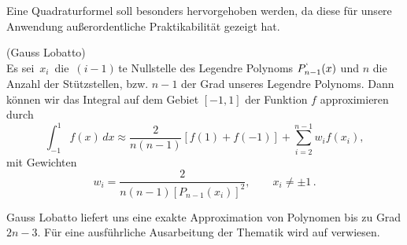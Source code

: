 Eine Quadraturformel soll besonders hervorgehoben werden, da diese für unsere Anwendung außerordentliche Praktikabilität gezeigt hat. 

\begin{Definition} (Gauss Lobatto) \\
Es sei $\, x_i \, $ die $\, (i-1) \,$te Nullstelle des Legendre Polynoms $P^{`}_{n-1}(x)$ und $n$ die Anzahl der Stützstellen, bzw. $n-1$ der Grad unseres Legendre Polynoms. Dann können wir das Integral auf dem Gebiet $[-1,1]$ der Funktion $f$ approximieren durch
\begin{equation*}
\int _{-1}^{1}{f(x)\,dx} \approx {\frac {2}{n(n-1)}}[f(1)+f(-1)]+\sum _{i=2}^{n-1}{w_{i}f(x_{i})},
\end{equation*}
mit Gewichten
\begin{equation*}
w_{i}={\frac {2}{n(n-1)[P_{n-1}(x_{i})]^{2}}},\qquad x_{i}\neq \pm 1 \, .
\end{equation*}
\end{Definition}

Gauss Lobatto liefert uns eine exakte Approximation von Polynomen bis zu Grad $2n-3$. Für eine ausführliche Ausarbeitung der Thematik wird auf \cite[79]{Rannacher} verwiesen.





